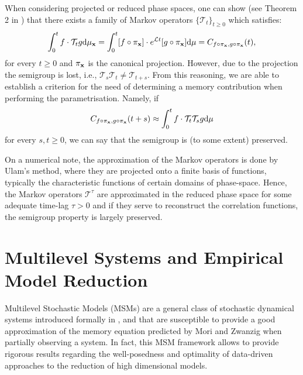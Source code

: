 \documentclass[12pt]{article}
\begin{document}
When considering projected or reduced phase spaces, one can show (see Theorem 2 in \cite{chekroun2019c}) that there exists a family of Markov operators $\{\mathcal{T}_t\}_{t\geq 0}$ which satisfies:
\begin{equation}\label{criterion}
\int _{0}^tf\cdot \mathcal{T}_tg\mathrm{d} \mu_{\mathbf{x}} = \int _{0}^t[f\circ \pi_{\mathbf{x}}]\cdot e^{\mathcal{L} t}[g\circ \pi _{\mathbf{x}}] \mathrm{d} \mu = C_{f\circ \pi_{\mathbf{x}},g \circ \pi_{\mathbf{x}}}(t),
\end{equation}
for every $t\geq0$ and $\pi_{\mathbf{x}}$ is the canonical projection. However, due to the projection the semigroup is lost, i.e., $\mathcal{T}_{s}\mathcal{T}_t\neq \mathcal{T}_{t+s}$. From this reasoning, we are able to establish a criterion for the need of determining a memory contribution when performing the parametrisation. Namely, if
\begin{equation}\label{criterion memory effects}
	C_{f\circ \pi_{\mathbf{x}},g \circ \pi_{\mathbf{x}}}(t+s) \approx \int _{0}^tf\cdot \mathcal{T}_t\mathcal{T}_sg\mathrm{d} \mu
\end{equation}
for every $s,t \geq 0$, we can say that the semigroup is (to some extent) preserved.

On a numerical note, the approximation of the Markov operators is done by Ulam's method, where they are projected onto a finite basis of functions, typically the characteristic functions of certain domains of phase-space. Hence, the Markov operators $\mathcal{T}^{\tau}$ are approximated in the reduced phase space for some adequate time-lag $\tau>0$ and if they serve to reconstruct the correlation functions, the semigroup property is largely preserved.

\section{Multilevel Systems and Empirical Model Reduction}

Multilevel Stochastic Models (MSMs) are a general class of stochastic dynamical systems introduced formally in \cite{kondrashovdata2015}, and that are susceptible to provide a good approximation of the memory equation predicted by Mori and Zwanzig when partially observing a system. In fact, this MSM framework allows to provide rigorous results regarding the well-posedness and optimality of data-driven approaches to the reduction of high dimensional models. 
\end{document}
